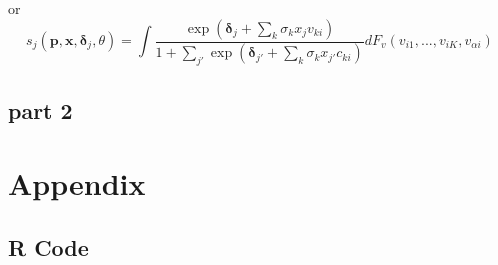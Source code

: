 \documentclass[11pt]{article}
\begin{document}
or 
$$ s_j(\bm p, \bm x, \bm \delta_j, \theta) = 
\int \frac{\exp (\bm \delta_j  + \sum_k \sigma_k x_j v_{ki})}
{1 + \sum_{j'} \exp(\bm \delta_{j'} + \sum_k \sigma_k x_{j'} c_{ki})}
dF_v(v_{i1}, ..., v_{iK}, v_{\alpha i})
$$



\subsection{part 2}




\section{Appendix}
\subsection{R Code}





\end{document}
